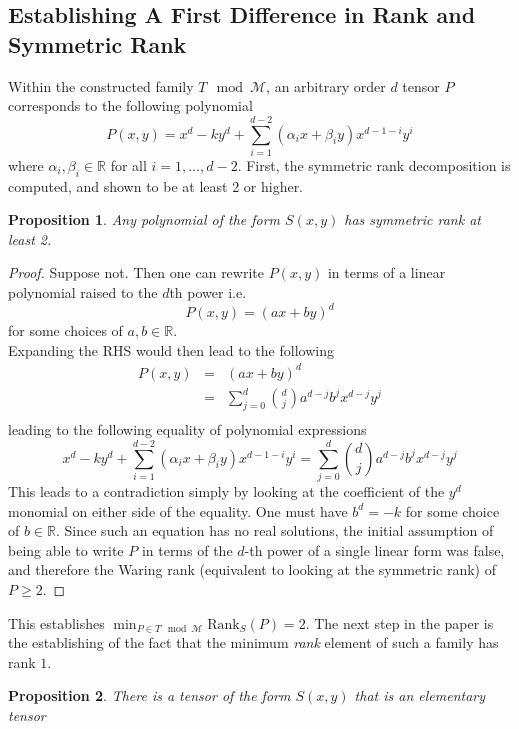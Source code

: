 \documentclass[12pt,a4paper,oneside]{book}
\def\reals{\mathbb{R}} %
\def\srank{\text{Rank}_S} %
\newtheorem{proposition}{Proposition}[section]
\theoremstyle{definition}
\begin{document}
\subsection*{Establishing A First Difference in Rank and Symmetric Rank}
Within the constructed family $T\mod\mathcal{M}$, an arbitrary order $d$ tensor $P$ corresponds to the following polynomial $$P(x,y) = x^d - ky^d + \sum_{i=1}^{d-2} (\alpha_i x + \beta_i y)x^{d-1-i}y^i$$where $\alpha_i, \beta_i \in \reals$ for all $i = 1,\ldots,d-2$. 
First, the symmetric rank decomposition is computed, and shown to be at least 2 or higher. 
\begin{proposition}
    Any polynomial of the form $S(x,y)$ has symmetric rank at least 2. \cite{wang_lower_2023}
\end{proposition}
\begin{proof}
    Suppose not. Then one can rewrite $P(x,y)$ in terms of a linear polynomial raised to the $d$th power i.e.
    $$P(x,y) = (ax + by)^d$$for some choices of $a,b \in \reals$.\\ Expanding the RHS would then lead to the following 
    \begin{eqnarray*}
        P(x,y) &=& (ax + by)^d\\
        &=& \sum_{j=0}^{d}\binom{d}{j} a^{d-j}b^jx^{d-j}y^j\\ 
    \end{eqnarray*}leading to the following equality of polynomial expressions
    $$x^d - ky^d + \sum_{i=1}^{d-2} (\alpha_i x + \beta_i y)x^{d-1-i}y^i = \sum_{j=0}^{d}\binom{d}{j} a^{d-j}b^jx^{d-j}y^j$$ This leads to a contradiction simply by looking at the coefficient of the $y^d$ monomial on either side of the equality. One must have $b^d = -k$ for some choice of $b \in \reals$.
    Since such an equation has no real solutions, the initial assumption of being able to write $P$ in terms of the $d$-th power of a single linear form was false, and therefore the Waring rank (equivalent to looking at the symmetric rank) of $P \geq 2$.
\end{proof}
This establishes $\min_{P \in T\mod\mathcal{M}} \srank(P) = 2$. The next step in the paper is the establishing of the fact that the minimum \textit{rank} element of such a family has rank $1$.
\begin{proposition}
    There is a tensor of the form $S(x,y)$ that is an elementary tensor \cite{wang_lower_2023}
\end{proposition}
\end{document}
